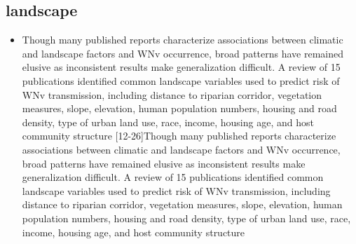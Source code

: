 \documentclass[a4, 12pt]{article}
\begin{document}
\subsection{landscape}
\begin{itemize}
\item Though many published reports characterize associations
between climatic and landscape factors and WNv
occurrence, broad patterns have remained elusive as
inconsistent results make generalization difficult. A
review of 15 publications identified common landscape
variables used to predict risk of WNv transmission,
including distance to riparian corridor, vegetation measures,
slope, elevation, human population numbers,
housing and road density, type of urban land use, race,
income, housing age, and host community structure
[12-26]Though many published reports characterize associations
between climatic and landscape factors and WNv
occurrence, broad patterns have remained elusive as
inconsistent results make generalization difficult. A
review of 15 publications identified common landscape
variables used to predict risk of WNv transmission,
including distance to riparian corridor, vegetation measures,
slope, elevation, human population numbers,
housing and road density, type of urban land use, race,
income, housing age, and host community structure \citep{ruiz2010local}
\end{itemize}

\newpage



\end{document}
